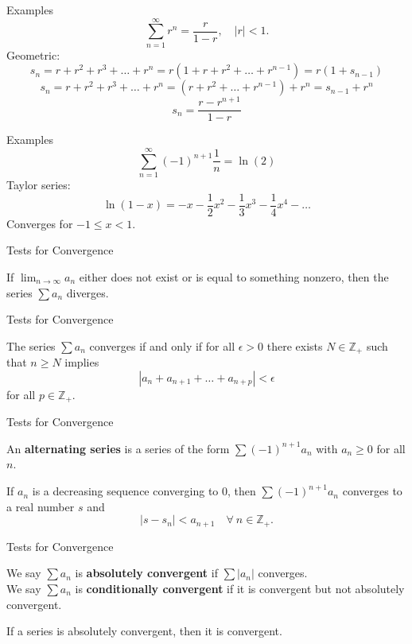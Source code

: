 \documentclass{beamer}
\begin{document}
\begin{frame}{Examples}
$$\sum_{n=1}^\infty r^n = \frac{r}{1-r},\quad |r| < 1.$$
\pause
Geometric:
\pause
$$s_n = r + r^2 + r^3 + \dots + r^n= r(1+r+r^2+\dots+r^{n-1}) = r(1+s_{n-1})$$
\pause
$$s_n = r + r^2 + r^3 + \dots + r^n= (r+r^2+\dots+r^{n-1}) + r^n = s_{n-1} + r^n$$
\pause
$$s_n = \frac{r-r^{n+1}}{1-r}$$
\end{frame}

\begin{frame}{Examples}
$$\sum_{n=1}^\infty (-1)^{n+1}\frac{1}{n} = \ln(2)$$
\pause
Taylor series:
\pause
$$\ln(1-x) = -x - \frac{1}{2}x^2 - \frac{1}{3}x^3 - \frac{1}{4}x^4 - \dots$$
\pause
Converges for $-1\leq x < 1$.
\end{frame}

\begin{frame}{Tests for Convergence}
\begin{thm}
If $\lim_{n\rightarrow\infty} a_n$ either does not exist or is equal to something nonzero, then the series $\sum a_n$ diverges.
\end{thm}
\end{frame}

\begin{frame}{Tests for Convergence}
\begin{thm}
The series $\sum a_n$ converges if and only if for all $\epsilon > 0$ there exists $N\in\mathbb Z_+$ such that $n\geq N$ implies
$$\left\lvert a_{n} + a_{n+1} + \dots + a_{n+p}\right\rvert < \epsilon$$
for all $p\in\mathbb Z_+$.
\end{thm}
\end{frame}

\begin{frame}{Tests for Convergence}
\begin{defn}
An \textbf{alternating series} is a series of the form $\sum (-1)^{n+1}a_n$ with $a_n\geq 0$ for all $n$.
\end{defn}
\begin{thm}
If $a_n$ is a decreasing sequence converging to $0$, then $\sum (-1)^{n+1}a_n$ converges to a real number $s$ and
$$|s-s_n| < a_{n+1}\quad\forall\ n\in\mathbb Z_+.$$
\end{thm}
\end{frame}

\begin{frame}{Tests for Convergence}
\begin{defn}
We say $\sum a_n$ is \textbf{absolutely convergent} if $\sum |a_n|$ converges.\\
We say $\sum a_n$ is \textbf{conditionally convergent} if it is convergent but not absolutely convergent.
\end{defn}
\begin{thm}
If a series is absolutely convergent, then it is convergent.
\end{thm}
\end{frame}
\end{document}
